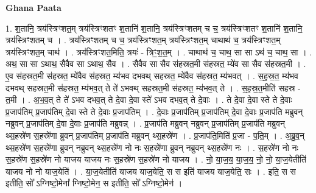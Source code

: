 \documentclass[17pt]{extarticle}
\begin{document}
\textbf{Ghana Paata } \newline

1. श॒तानि॒ त्रय॑स्त्रिꣳशत॒म् त्रय॑स्त्रिꣳशतꣳ श॒तानि॑ श॒तानि॒ त्रय॑स्त्रिꣳशतम् च च॒ त्रय॑स्त्रिꣳशतꣳ श॒तानि॑ श॒तानि॒ त्रय॑स्त्रिꣳशतम् च । . त्रय॑स्त्रिꣳशतम् च च॒ त्रय॑स्त्रिꣳशत॒म् त्रय॑स्त्रिꣳशत॒म् चाथाथ॑ च॒ त्रय॑स्त्रिꣳशत॒म् त्रय॑स्त्रिꣳशत॒म् चाथ॑ । . त्रय॑स्त्रिꣳशत॒मिति॒ त्रयः॑ - त्रिꣳ॒॒श॒त॒म् । . चाथाथ॑ च॒ चाथ॒ सा सा ऽथ॑ च॒ चाथ॒ सा । . अथ॒ सा सा ऽथाथ॒ सैवैव सा ऽथाथ॒ सैव । . सैवैव सा सैव स॑हस्रत॒मी स॑हस्रत॒ म्ये॑व सा सैव स॑हस्रत॒मी । . ए॒व स॑हस्रत॒मी स॑हस्रत॒ म्ये॑वैव स॑हस्रत॒ म्य॑भव दभवथ् सहस्रत॒ म्ये॑वैव स॑हस्रत॒ म्य॑भवत् । . स॒ह॒स्र॒त॒ म्य॑भव दभवथ् सहस्रत॒मी स॑हस्रत॒ म्य॑भव॒त् ते ते॑ ऽभवथ् सहस्रत॒मी स॑हस्रत॒ म्य॑भव॒त् ते । . स॒ह॒स्र॒त॒मीति॑ सहस्र - त॒मी । . अ॒भ॒व॒त् ते ते॑ ऽभव दभव॒त् ते दे॒वा दे॒वा स्ते॑ ऽभव दभव॒त् ते दे॒वाः । . ते दे॒वा दे॒वा स्ते ते दे॒वाः प्र॒जाप॑तिम् प्र॒जाप॑तिम् दे॒वा स्ते ते दे॒वाः प्र॒जाप॑तिम् । . दे॒वाः प्र॒जाप॑तिम् प्र॒जाप॑तिम् दे॒वा दे॒वाः प्र॒जाप॑ति मब्रुवन् नब्रुवन् प्र॒जाप॑तिम् दे॒वा दे॒वाः प्र॒जाप॑ति मब्रुवन्न् । . प्र॒जाप॑ति मब्रुवन् नब्रुवन् प्र॒जाप॑तिम् प्र॒जाप॑ति मब्रुवन् थ्स॒हस्रे॑ण स॒हस्रे॑णा ब्रुवन् प्र॒जाप॑तिम् प्र॒जाप॑ति मब्रुवन् थ्स॒हस्रे॑ण । . प्र॒जाप॑ति॒मिति॑ प्र॒जा - प॒ति॒म् । . अ॒ब्रु॒व॒न् थ्स॒हस्रे॑ण स॒हस्रे॑णा ब्रुवन् नब्रुवन् थ्स॒हस्रे॑ण नो नः स॒हस्रे॑णा ब्रुवन् नब्रुवन् थ्स॒हस्रे॑ण नः । . स॒हस्रे॑ण नो नः स॒हस्रे॑ण स॒हस्रे॑ण नो याजय याजय नः स॒हस्रे॑ण स॒हस्रे॑ण नो याजय । . नो॒ या॒ज॒य॒ या॒ज॒य॒ नो॒ नो॒ या॒ज॒येतीति॑ याजय नो नो याज॒येति॑ । . या॒ज॒येतीति॑ याजय याज॒येति॒ स स इति॑ याजय याज॒येति॒ सः । . इति॒ स स इतीति॒ सो᳚ ऽग्निष्टो॒मेना᳚ ग्निष्टो॒मेन॒ स इतीति॒ सो᳚ ऽग्निष्टो॒मेन॑ । \newline
\end{document}
